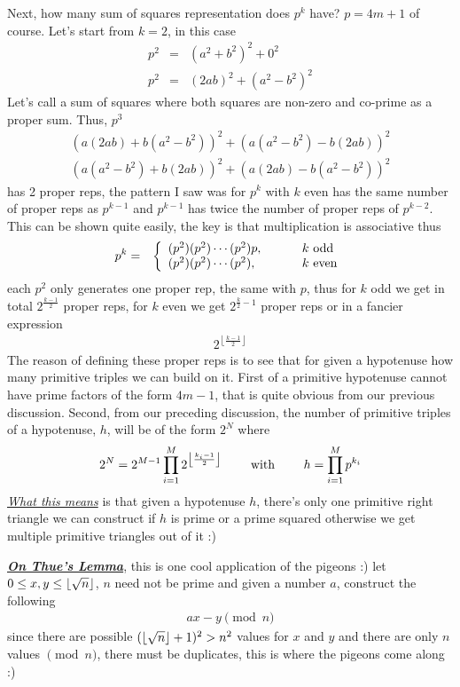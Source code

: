 \documentclass[aps,preprint,preprintnumbers,nofootinbib,showpacs,prd]{revtex4-1}
\newcommand{\nbea}{\begin{eqnarray*}}
\newcommand{\neea}{\end{eqnarray*}}
\DeclarePairedDelimiter{\floor}{\lfloor}{\rfloor}
\begin{document}
Next, how many sum of squares representation does $p^k$ have? $p = 4m+1$ of course. Let's start from $k=2$, in this case
%
\nbea
p^2 & = & (a^2 + b^2)^2 + 0^2 \\
p^2 & = & (2ab)^2 + (a^2 - b^2)^2
\neea
%
Let's call a sum of squares where both squares are non-zero and co-prime as a proper sum. Thus, $p^3$ 
%
\nbea
(a(2ab) + b(a^2 - b^2))^2 + (a(a^2 - b^2) - b(2ab))^2 \\
(a(a^2 - b^2) + b(2ab))^2 + (a(2ab) - b(a^2 - b^2))^2
\neea
%
has 2 proper reps, the pattern I saw was for $p^k$ with $k$ even has the same number of proper reps as $p^{k-1}$ and $p^{k-1}$ has twice the number of proper reps of $p^{k-2}$. This can be shown quite easily, the key is that multiplication is associative thus
%
\nbea
p^{k} & = & \left\{
\begin{array}{l l}
(p^2)(p^2)\cdots(p^2)p, & ~~~~~~~k~{\rm odd} \\
(p^2)(p^2)\cdots(p^2), & ~~~~~~~k~{\rm even}
\end{array}
\right.
\neea
%
each $p^2$ only generates one proper rep, the same with $p$, thus for $k$ odd we get in total $2^{\frac{k-1}{2}}$ proper reps, for $k$ even we get $2^{\frac{k}{2}-1}$ proper reps or in a fancier expression
%
\nbea
2^{\left\lfloor\frac{k-1}{2}\right\rfloor}
\neea
%
The reason of defining these proper reps is to see that for given a hypotenuse how many primitive triples we can build on it. First of a primitive hypotenuse cannot have prime factors of the form $4m-1$, that is quite obvious from our previous discussion. Second, from our preceding discussion, the number of primitive triples of a hypotenuse, $h$, will be of the form $2^{N}$ where
%
\nbea
2^N = 2^{M-1}\prod_{i=1}^M 2^{\left\lfloor\frac{k_i-1}{2}\right\rfloor} ~~~~~~~{\rm with} ~~~~~~~ h = \prod_{i=1}^M p^{k_i}
\neea
%
\underline{\textit{What this means}} is that given a hypotenuse $h$, there's only one primitive right triangle we can construct if $h$ is prime or a prime squared otherwise we get multiple primitive triangles out of it :)

\underline{\textit{\textbf{On Thue's Lemma}}}, this is one cool application of the pigeons :) let $0 \le x,y \le \floor{\sqrt{n}}$, $n$ need not be prime and given a number $a$, construct the following
%
\nbea
ax - y \pmod{n}
\neea
%
since there are possible $(\floor{\sqrt{n}} + 1)^2 > n^2$ values for $x$ and $y$ and there are only $n$ values $\pmod{n}$, there must be duplicates, this is where the pigeons come along :)
\end{document}
